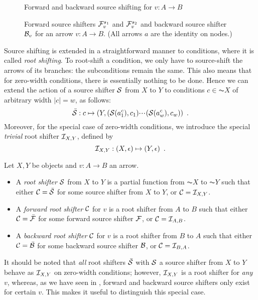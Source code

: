 \begin{figure}[t]
\centering

\caption{Forward and backward source shifting for $v:A\to B$}
\end{figure}

\begin{figure}
\centering

\caption{Forward source shifters $\mathcal{F}_v^{s_1}$ and $\mathcal{F}_v^{s_2}$ and backward source shifter $\mathcal{B}_v$ for an arrow $v:A\to B$. (All arrows $a$ are the identity on nodes.)}
\end{figure}

Source shifting is extended in a straightforward manner to conditions, where it is called \emph{root shifting}. To root-shift a condition, we only have to source-shift the arrows of its branches: the subconditions remain the same. This also means that for zero-width conditions, there is essentially nothing to be done. Hence we can extend the action of a source shifter $\mathcal{S}$ from $X$ to $Y$ to conditions $c\in \AC X$ of arbitrary width $|c|=w$, as follows:
\[ \bar{\mathcal{S}}: c\mapsto (Y,(\mathcal{S}(a^c_1),c_1){\cdotp\mkern-2mu\cdotp\mkern-2mu\cdotp\mkern1mu} (\mathcal{S}(a^c_w),c_w)) \enspace. \]
Moreover, for the special case of zero-width conditions, we introduce the special \emph{trivial} root shifter $\mathcal{I}_{X,Y}$, defined by
\[ \mathcal{I}_{X,Y}: (X,\epsilon) \mapsto (Y,\epsilon) \enspace. \]

\begin{definition}
Let $X,Y$ be objects and $v:A\to B$ an arrow.
\begin{itemize}[topsep=\smallskipamount]
\item A \emph{root shifter} $\mathcal{S}$ from $X$ to $Y$ is a partial function from $\AC X$ to $\AC Y$ such that either $\mathcal{C}=\bar{\mathcal{S}}$ for some source shifter from $X$ to $Y$, or $\mathcal{C}=\mathcal{I}_{X,Y}$.

\item A \emph{forward root shifter} $\mathcal{C}$ for $v$ is a root shifter from $A$ to $B$ such that either $\mathcal{C}=\bar{\mathcal{F}}$ for some forward source shifter $\mathcal{F}$, or $\mathcal{C}=\mathcal{I}_{A,B}$.

\item A \emph{backward root shifter} $\mathcal{C}$ for $v$ is a root shifter from $B$ to $A$ such that either $\mathcal{C}=\bar{\mathcal{B}}$ for some backward source shifter $\mathcal{B}$, or $\mathcal{C}=\mathcal{I}_{B,A}$.
\end{itemize}
\end{definition}
%
It should be noted that \emph{all} root shifters $\bar{\mathcal{S}}$ with $\mathcal{S}$ a source shifter from $X$ to $Y$ behave as $\mathcal{I}_{X,Y}$ on zero-width conditions; however, $\mathcal{I}_{X,Y}$ is a root shifter for \emph{any} $v$, whereas, as we have seen in , forward and backward source shifters only exist for certain $v$. This makes it useful to distinguish this special case.

